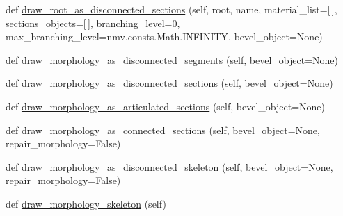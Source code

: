 \begin{DoxyCompactItemize}
\item 
def \hyperlink{classmeshy_1_1neuromorphovis_1_1builders_1_1skeleton_1_1skeleton__builder_1_1SkeletonBuilder_adc617763064ca3c3e8a24fc9124edb59}{draw\+\_\+root\+\_\+as\+\_\+disconnected\+\_\+sections} (self, root, name, material\+\_\+list=\mbox{[}$\,$\mbox{]}, sections\+\_\+objects=\mbox{[}$\,$\mbox{]}, branching\+\_\+level=0, max\+\_\+branching\+\_\+level=nmv.\+consts.\+Math.\+I\+N\+F\+I\+N\+I\+TY, bevel\+\_\+object=None)
\item 
def \hyperlink{classmeshy_1_1neuromorphovis_1_1builders_1_1skeleton_1_1skeleton__builder_1_1SkeletonBuilder_a1785354a60c401ba9cbab83b41cb2697}{draw\+\_\+morphology\+\_\+as\+\_\+disconnected\+\_\+segments} (self, bevel\+\_\+object=None)
\item 
def \hyperlink{classmeshy_1_1neuromorphovis_1_1builders_1_1skeleton_1_1skeleton__builder_1_1SkeletonBuilder_a2be1ac0faefe57da0e709c8af413d717}{draw\+\_\+morphology\+\_\+as\+\_\+disconnected\+\_\+sections} (self, bevel\+\_\+object=None)
\item 
def \hyperlink{classmeshy_1_1neuromorphovis_1_1builders_1_1skeleton_1_1skeleton__builder_1_1SkeletonBuilder_ae2faa5a8dc2eb720259bfc0a391474d8}{draw\+\_\+morphology\+\_\+as\+\_\+articulated\+\_\+sections} (self, bevel\+\_\+object=None)
\item 
def \hyperlink{classmeshy_1_1neuromorphovis_1_1builders_1_1skeleton_1_1skeleton__builder_1_1SkeletonBuilder_a6ee88473a50e9347a14cbaed66d5ee49}{draw\+\_\+morphology\+\_\+as\+\_\+connected\+\_\+sections} (self, bevel\+\_\+object=None, repair\+\_\+morphology=False)
\item 
def \hyperlink{classmeshy_1_1neuromorphovis_1_1builders_1_1skeleton_1_1skeleton__builder_1_1SkeletonBuilder_aea0c5c475aa723f22c21be74ffba453f}{draw\+\_\+morphology\+\_\+as\+\_\+disconnected\+\_\+skeleton} (self, bevel\+\_\+object=None, repair\+\_\+morphology=False)
\item 
def \hyperlink{classmeshy_1_1neuromorphovis_1_1builders_1_1skeleton_1_1skeleton__builder_1_1SkeletonBuilder_a9c96523f97ee02dfda8bf539a5ae0c17}{draw\+\_\+morphology\+\_\+skeleton} (self)
\end{DoxyCompactItemize}
